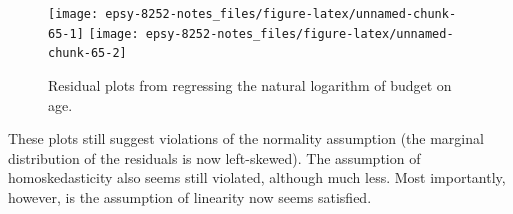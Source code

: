 \documentclass[]{book}
\newenvironment{Shaded}{\begin{snugshade}}{\end{snugshade}}
\newcommand{\CommentTok}[1]{\textcolor[rgb]{0.56,0.35,0.01}{\textit{#1}}}
\newcommand{\DataTypeTok}[1]{\textcolor[rgb]{0.13,0.29,0.53}{#1}}
\newcommand{\DecValTok}[1]{\textcolor[rgb]{0.00,0.00,0.81}{#1}}
\newcommand{\FloatTok}[1]{\textcolor[rgb]{0.00,0.00,0.81}{#1}}
\newcommand{\KeywordTok}[1]{\textcolor[rgb]{0.13,0.29,0.53}{\textbf{#1}}}
\newcommand{\NormalTok}[1]{#1}
\newcommand{\OperatorTok}[1]{\textcolor[rgb]{0.81,0.36,0.00}{\textbf{#1}}}
\newcommand{\StringTok}[1]{\textcolor[rgb]{0.31,0.60,0.02}{#1}}
\begin{document}
\begin{Shaded}
\end{Shaded}

\begin{figure}

{\centering \texttt{[image: epsy-8252-notes\_files/figure-latex/unnamed-chunk-65-1]} \texttt{[image: epsy-8252-notes\_files/figure-latex/unnamed-chunk-65-2]} 

}

\caption{Residual plots from regressing the natural logarithm of budget on age.}\label{fig:unnamed-chunk-65}
\end{figure}

These plots still suggest violations of the normality assumption (the marginal distribution of the residuals is now left-skewed). The assumption of homoskedasticity also seems still violated, although much less. Most importantly, however, is the assumption of linearity now seems satisfied.
\end{document}
